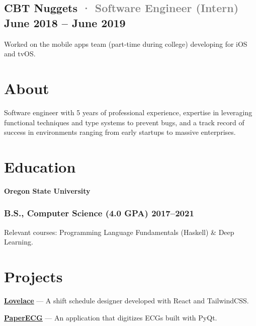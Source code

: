 \documentclass[10pt]{article} %
\let\defaultref\href
\renewcommand{\href}[2]{%
  \defaultref{#1}{\ul{#2}}%
}
\renewcommand{\emph}[1]{%
  \textcolor{gray}{#1}%
}
\begin{document}
\begin{paracol}{2}
{\subsection{\texorpdfstring{CBT Nuggets \emph{· \small Software Engineer
(Intern)} \hfill \small June 2018 -- June
2019}{CBT Nuggets · Software Engineer (Intern) June 2018 -- June 2019}}\label{cbt-nuggets-software-engineer-intern-june-2018-june-2019}}

Worked on the mobile apps team (part-time during college) developing for
iOS and tvOS.

\switchcolumn

\hypertarget{about}{%
\section{About}\label{about}}

Software engineer with 5 years of professional experience, expertise in
leveraging functional techniques and type systems to prevent bugs, and a
track record of success in environments ranging from early startups to
massive enterprises.

\raggedright

\hypertarget{education}{%
\section{Education}\label{education}}

\textbf{Oregon State University}

\hypertarget{b.s.-computer-science-4.0-gpa-20172021}{%
\subsubsection{B.S., Computer Science (4.0 GPA)
2017--2021}\label{b.s.-computer-science-4.0-gpa-20172021}}

Relevant courses: Programming Language Fundamentals (Haskell) \& Deep
Learning.

\hypertarget{projects}{%
\section{Projects}\label{projects}}

\textbf{\href{http://julianfortune.com/lovelace/}{Lovelace}} --- A shift
schedule designer developed with React and TailwindCSS.

\textbf{\href{https://github.com/Tereshchenkolab/paper-ecg}{PaperECG}}
--- An application that digitizes ECGs built with PyQt.


\end{paracol}
\end{document}
